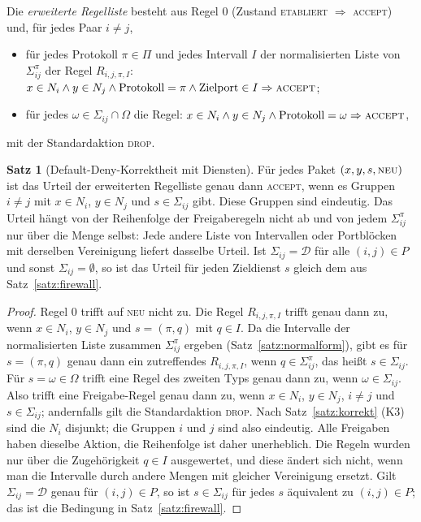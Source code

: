 \documentclass[a4paper,12pt, twoside]{report}
\theoremstyle{definition}
\newtheorem{satz}{Satz}
\begin{document}
Die \emph{erweiterte Regelliste} besteht aus Regel $0$ (Zustand \textsc{etabliert} $\Rightarrow$ \textsc{accept}) und, für jedes Paar $i\ne j$,
\begin{itemize}
	\item für jedes Protokoll $\pi\in\Pi$ und jedes Intervall $I$ der normalisierten Liste von $\Sigma_{ij}^\pi$ der Regel $R_{i,j,\pi,I}$: $x\in N_i\wedge y\in N_j\wedge\text{Protokoll}=\pi\wedge\text{Zielport}\in I\Rightarrow\textsc{accept}$;
	\item für jedes $\omega\in\Sigma_{ij}\cap\Omega$ die Regel: $x\in N_i\wedge y\in N_j\wedge\text{Protokoll}=\omega\Rightarrow\textsc{accept}$,
\end{itemize}
mit der Standardaktion \textsc{drop}.

\begin{satz}[Default-Deny-Korrektheit mit Diensten]
\label{satz:ports-urteil}
	Für jedes Paket $(x,y,s,\textsc{neu})$ ist das Urteil der erweiterten Regelliste genau dann \textsc{accept}, wenn es Gruppen $i\ne j$ mit $x\in N_i$, $y\in N_j$ und $s\in\Sigma_{ij}$ gibt. Diese Gruppen sind eindeutig. Das Urteil hängt von der Reihenfolge der Freigaberegeln nicht ab und von jedem $\Sigma_{ij}^\pi$ nur über die Menge selbst: Jede andere Liste von Intervallen oder Portblöcken mit derselben Vereinigung liefert dasselbe Urteil. Ist $\Sigma_{ij}=\mathcal{D}$ für alle $(i,j)\in P$ und sonst $\Sigma_{ij}=\emptyset$, so ist das Urteil für jeden Zieldienst $s$ gleich dem aus Satz~\ref{satz:firewall}.
\end{satz}

\begin{proof}
	Regel $0$ trifft auf \textsc{neu} nicht zu. Die Regel $R_{i,j,\pi,I}$ trifft genau dann zu, wenn $x\in N_i$, $y\in N_j$ und $s=(\pi,q)$ mit $q\in I$. Da die Intervalle der normalisierten Liste zusammen $\Sigma_{ij}^\pi$ ergeben (Satz~\ref{satz:normalform}), gibt es für $s=(\pi,q)$ genau dann ein zutreffendes $R_{i,j,\pi,I}$, wenn $q\in\Sigma_{ij}^\pi$, das heißt $s\in\Sigma_{ij}$. Für $s=\omega\in\Omega$ trifft eine Regel des zweiten Typs genau dann zu, wenn $\omega\in\Sigma_{ij}$. Also trifft eine Freigabe-Regel genau dann zu, wenn $x\in N_i$, $y\in N_j$, $i\neq j$ und $s\in\Sigma_{ij}$; andernfalls gilt die Standardaktion \textsc{drop}. Nach Satz~\ref{satz:korrekt} (K3) sind die $N_i$ disjunkt; die Gruppen $i$ und $j$ sind also eindeutig. Alle Freigaben haben dieselbe Aktion, die Reihenfolge ist daher unerheblich. Die Regeln wurden nur über die Zugehörigkeit $q\in I$ ausgewertet, und diese ändert sich nicht, wenn man die Intervalle durch andere Mengen mit gleicher Vereinigung ersetzt. Gilt $\Sigma_{ij}=\mathcal{D}$ genau für $(i,j)\in P$, so ist $s\in\Sigma_{ij}$ für jedes $s$ äquivalent zu $(i,j)\in P$; das ist die Bedingung in Satz~\ref{satz:firewall}.
\end{proof}
\end{document}
